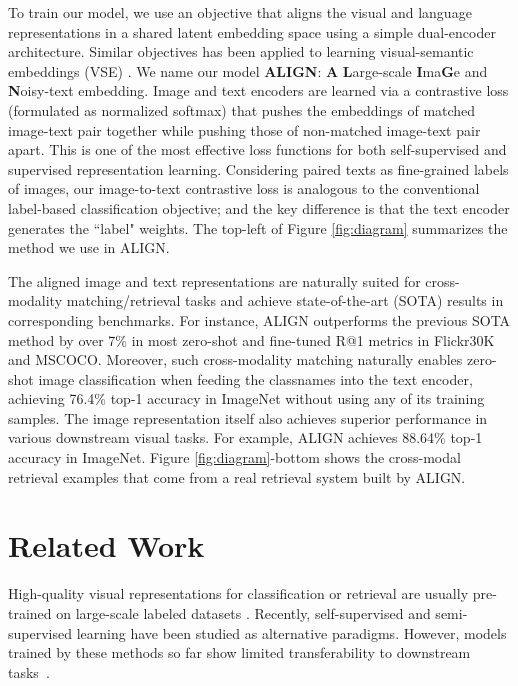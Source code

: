 \documentclass{article}
\begin{document}
To train our model, we use an objective that aligns the visual and language representations in a shared latent embedding space using a simple dual-encoder architecture. Similar objectives has been applied to learning visual-semantic embeddings (VSE) \cite{frome:devise, faghri:vse++}. We name our model \textbf{ALIGN}: \textbf{A} \textbf{L}arge-scale \textbf{I}ma\textbf{G}e and \textbf{N}oisy-text embedding. Image and text encoders are learned via a contrastive loss (formulated as normalized softmax) that pushes the embeddings of matched image-text pair together while pushing those of non-matched image-text pair apart. This is one of the most effective loss functions for both self-supervised \cite{chen:simclr} and supervised \cite{zhai:norm_softmax, musgrave:metric_check} representation learning. Considering paired texts as fine-grained labels of images, our image-to-text contrastive loss is analogous to the conventional label-based classification objective; and the key difference is that the text encoder generates the ``label" weights. The top-left of Figure \ref{fig:diagram} summarizes the method we use in ALIGN.

The aligned image and text representations are naturally suited for cross-modality matching/retrieval tasks and achieve state-of-the-art (SOTA) results in corresponding benchmarks. For instance, ALIGN outperforms the previous SOTA method by over 7\% in most zero-shot and fine-tuned R@1 metrics in Flickr30K and MSCOCO. Moreover, such cross-modality matching naturally enables zero-shot image classification when feeding the classnames into the text encoder, achieving 76.4\% top-1 accuracy in ImageNet without using any of its training samples. The image representation itself also achieves superior performance in various downstream visual tasks. For example, ALIGN achieves 88.64\% top-1 accuracy in ImageNet.  Figure \ref{fig:diagram}-bottom shows the cross-modal retrieval examples that come from a real retrieval system built by ALIGN.

\vspace{-2mm}
\section{Related Work}

High-quality visual representations for classification or retrieval are usually pre-trained on large-scale labeled datasets \cite{mahajan:wsl, kolensnikov:bit, dosovitskiy:vit, juan:graphrise}. Recently, self-supervised \citep{chen:simclr, tian:cmc, he:moco, misra:pirl, li:pcl, grill:byol, caron:swav} and semi-supervised learning \citep{yalniz2019billion, xie:noisy_student, pham:mpl} have been studied as alternative paradigms. However, models trained by these methods so far show limited transferability to downstream tasks~\cite{zoph2020rethinking}. 
\end{document}
